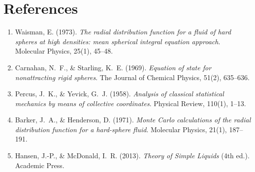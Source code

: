 \documentclass[11pt,a4paper]{article}
\begin{document}
\section{References}
\begin{enumerate}
    \item Waisman, E. (1973). \textit{The radial distribution function for a fluid of hard spheres at high densities: mean spherical integral equation approach}. Molecular Physics, 25(1), 45--48.
    \item Carnahan, N.~F., \& Starling, K.~E. (1969). \textit{Equation of state for nonattracting rigid spheres}. The Journal of Chemical Physics, 51(2), 635--636.
    \item Percus, J.~K., \& Yevick, G.~J. (1958). \textit{Analysis of classical statistical mechanics by means of collective coordinates}. Physical Review, 110(1), 1--13.
    \item Barker, J.~A., \& Henderson, D. (1971). \textit{Monte Carlo calculations of the radial distribution function for a hard-sphere fluid}. Molecular Physics, 21(1), 187--191.
    \item Hansen, J.-P., \& McDonald, I.~R. (2013). \textit{Theory of Simple Liquids} (4th ed.). Academic Press.
\end{enumerate}
\end{document}
